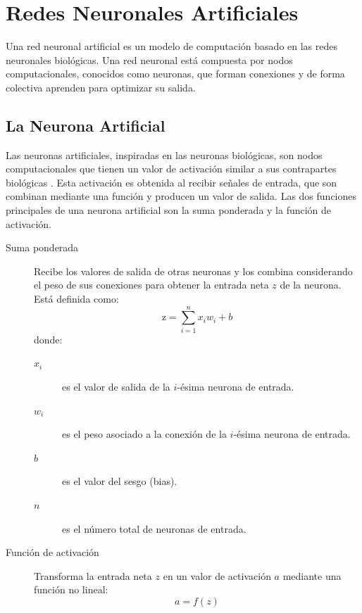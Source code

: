 \section{Redes Neuronales Artificiales}
Una red neuronal artificial es un modelo de computación basado en las redes neuronales 
biológicas. Una red neuronal está compuesta por nodos computacionales,
conocidos como neuronas, que forman conexiones y de forma colectiva aprenden para
optimizar su salida.

\subsection{La Neurona Artificial}
Las neuronas artificiales, inspiradas en las
neuronas biológicas, son nodos computacionales que tienen un valor de activación
similar a sus contrapartes biológicas \parencite[p.11]{da2016artificial}. Esta activación es obtenida al recibir señales 
de entrada, que son combinan mediante una función
y producen un valor de salida. Las dos funciones principales de una neurona artificial
son la suma ponderada y la función de activación.

\begin{description}
    \item[Suma ponderada] Recibe los valores de salida de otras neuronas y los combina 
    considerando el peso de sus conexiones para obtener la entrada neta $z$ de la neurona.
    Está definida como:
    \begin{equation}
        \text{z} = \sum_{i=1}^{n}x_{i} w_{i} + b
    \label{eq:suma_ponderada}
    \end{equation}
    donde:
    \begin{description}
        \item[$x_{i}$] es el valor de salida de la $i$-ésima neurona de entrada.
        \item[$w_{i}$] es el peso asociado a la conexión de la $i$-ésima neurona de entrada.
        \item[$b$] es el valor del sesgo (bias).
        \item[$n$] es el número total de neuronas de entrada.
    \end{description}
    \item[Función de activación] Transforma la entrada neta $z$ en un valor de activación
    $a$ mediante una función no lineal:
    \begin{equation}
        a = f(z)
    \end{equation}
\end{description}

